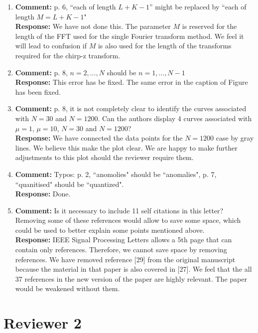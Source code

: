 \documentclass[a4paper,10pt]{article}
\begin{document}
\begin{enumerate}
\item\textbf{Comment:}
p. 6, ``each of length $L+K-1$'' might be replaced by ``each of length $M = L + K - 1$"
\\
\textbf{Response:}
We have not done this.  The parameter $M$ is reserved for the length of the FFT used for the single Fourier transform method.  We feel it will lead to confusion if $M$ is also used for the length of the transforms required for the chirp-z transform.


\item\textbf{Comment:}
p. 8, $n = 2,\dots,N$ should be $n = 1, \dots, N - 1$
\\
\textbf{Response:}
This error has be fixed.  The same error in the caption of Figure~ has been fixed.


\item\textbf{Comment:}
p. 8, it is not completely clear to identify the curves associated with $N = 30$ and $N = 1200$. Can the authors display 4 curves associated with $\mu= 1$, $\mu = 10$, $N = 30$ and $N = 1200$?
\\
\textbf{Response:}
We have connected the data points for the $N=1200$ case by gray lines.  We believe this make the plot clear.  We are happy to make further adjustments to this plot should the reviewer require them. 

\item\textbf{Comment:}
Typos: p. 2, “anomolies" should be “anomalies", p. 7, “quanitised" should be
“quantized".
\\
\textbf{Response:}
Done.


\item\textbf{Comment:} 
Is it necessary to include 11 self citations in this letter? Removing some of
these references would allow to save some space, which could be used to better
explain some points mentioned above.
\\
\textbf{Response:}
IEEE Signal Processing Letters allows a 5th page that can contain only references.  Therefore, we cannot save space by removing references.   We have removed reference [29] from the original manuscript because the material in that paper is also covered in [27].  We feel that the all 37 references in the new version of the paper are highly relevant.  The paper would be weakened without them.

\end{enumerate}



\section*{Reviewer 2}
\end{document}
